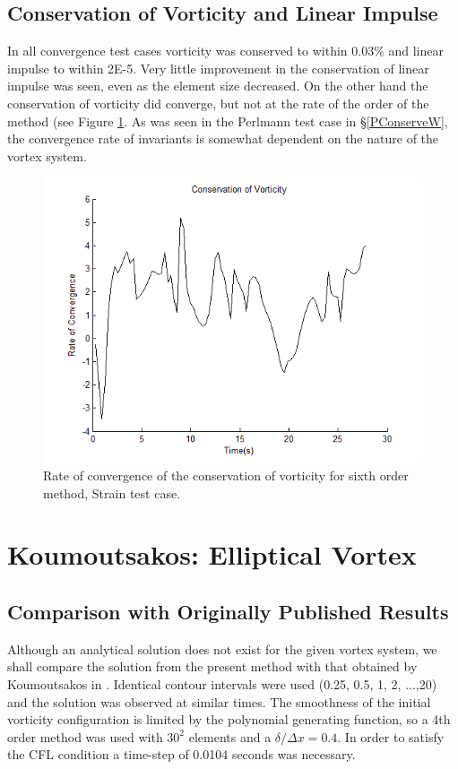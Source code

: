 \documentclass[letterpaper,12pt]{report}
\begin{document}
\subsection{Conservation of Vorticity and Linear Impulse}
In all convergence test cases vorticity was conserved to within 0.03\% and linear impulse to within 2E-5. Very little improvement in the conservation of linear impulse was seen, even as the element size decreased. On the other hand the conservation of vorticity did converge, but not at the rate of the order of the method (see Figure \ref{fig:StrainConserve}. As was seen in the Perlmann test case in \S\ref{PConserveW}, the convergence rate of invariants is somewhat dependent on the nature of the vortex system.
\begin{figure}
\centering
\includegraphics[width=1\textwidth]{StrainConserve.PNG}
\caption{\label{fig:StrainConserve}Rate of convergence of the conservation of vorticity for sixth order method, Strain test case. }
\end{figure}

\section{Koumoutsakos: Elliptical Vortex}
%
\subsection{Comparison with Originally Published Results}\label{KoumComper}
Although an analytical solution does not exist for the given vortex system, we shall compare the solution from the present method with that obtained by Koumoutsakos in \cite{Koum1997}. Identical contour intervals were used (0.25, 0.5, 1, 2, ...,20) and the solution was observed at similar times. The smoothness of the initial vorticity configuration is limited by the polynomial generating function, so a 4th order method was used with $30^2$ elements and a $\delta/\Delta x=0.4$. In order to satisfy the CFL condition a time-step of 0.0104 seconds was necessary.
\end{document}
